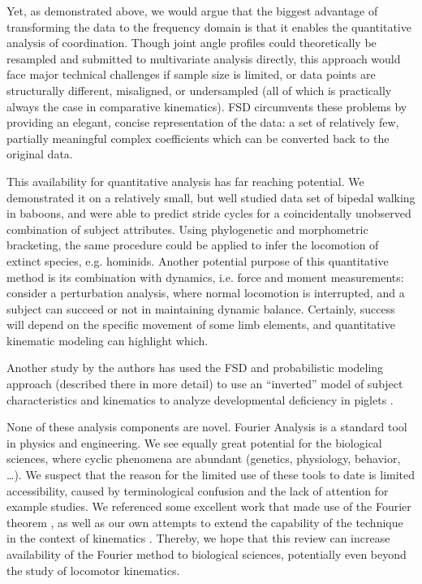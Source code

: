 \documentclass[10pt,a4paper]{article}
\begin{document}
Yet, as demonstrated above, we would argue that the biggest advantage of transforming the data to the frequency domain is that it enables the quantitative analysis of coordination.
Though joint angle profiles could theoretically be resampled and submitted to multivariate analysis directly, this approach would face major technical challenges if sample size is limited, or data points are structurally different, misaligned, or undersampled (all of which is practically always the case in comparative kinematics).
FSD circumvents these problems by providing an elegant, concise representation of the data: a set of relatively few, partially meaningful complex coefficients which can be converted back to the original data.


This availability for quantitative analysis has far reaching potential.
We demonstrated it on a relatively small, but well studied data set of bipedal walking in baboons, and were able to predict stride cycles for a coincidentally unobserved combination of subject attributes.
Using phylogenetic and morphometric bracketing, the same procedure could be applied to infer the locomotion of extinct species, e.g. hominids.
Another potential purpose of this quantitative method is its combination with dynamics, i.e. force and moment measurements:
consider a perturbation analysis, where normal locomotion is interrupted, and a subject can succeed or not in maintaining dynamic balance.
Certainly, success will depend on the specific movement of some limb elements, and quantitative kinematic modeling can highlight which.

Another study by the authors has used the FSD and probabilistic modeling approach (described there in more detail) to use an ``inverted'' model of subject characteristics and kinematics to analyze developmental deficiency in piglets \citep{Mielke2022}.


None of these analysis components are novel.
Fourier Analysis is a standard tool in physics and engineering.
We see equally great potential for the biological sciences, where cyclic phenomena are abundant (genetics, physiology, behavior, \ldots{}).
We suspect that the reason for the limited use of these tools to date is limited accessibility, caused by terminological confusion and the lack of attention for example studies.
We referenced some excellent work that made use of the Fourier theorem \citep{Bernstein1935,Pike2002,Webb2007}, as well as our own attempts to extend the capability of the technique in the context of kinematics \citep{Mielke2019,Mielke2022}.
Thereby, we hope that this review can increase availability of the Fourier method to biological sciences, potentially even beyond the study of locomotor kinematics.
\end{document}
